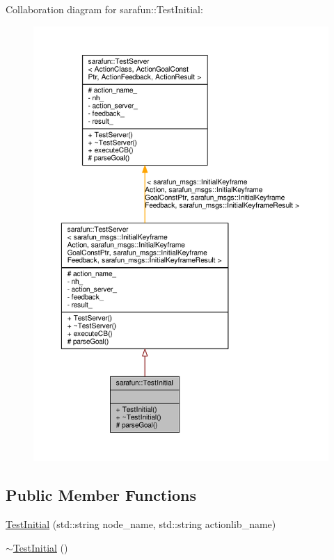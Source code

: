 Collaboration diagram for sarafun\-:\-:Test\-Initial\-:\nopagebreak
\begin{figure}[H]
\begin{center}
\leavevmode
\includegraphics[width=350pt]{d8/d5d/classsarafun_1_1TestInitial__coll__graph}
\end{center}
\end{figure}
\subsection*{Public Member Functions}
\begin{DoxyCompactItemize}
\item 
\hyperlink{classsarafun_1_1TestInitial_a823bdc6188c1f3cdf7546b2ed9ea7ea7_a823bdc6188c1f3cdf7546b2ed9ea7ea7}{Test\-Initial} (std\-::string node\-\_\-name, std\-::string actionlib\-\_\-name)
\item 
\hyperlink{classsarafun_1_1TestInitial_af9c5ec764aeb3f64c640714844dc23c4_af9c5ec764aeb3f64c640714844dc23c4}{$\sim$\-Test\-Initial} ()
\end{DoxyCompactItemize}
